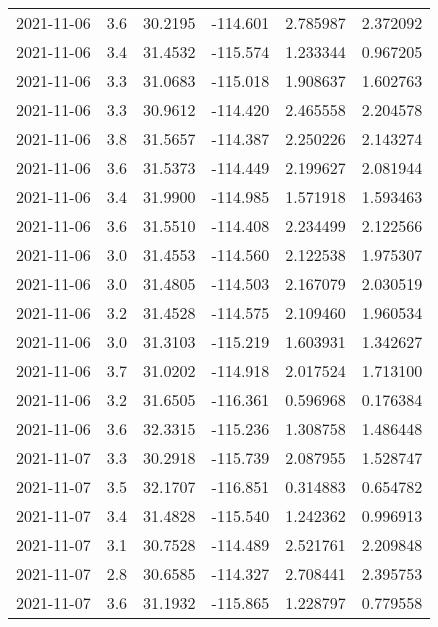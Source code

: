 \begin{tabular}{lrrrrr}
2021-11-06 &       3.6 &  30.2195 &  -114.601 &         2.785987 &         2.372092 \\
2021-11-06 &       3.4 &  31.4532 &  -115.574 &         1.233344 &         0.967205 \\
2021-11-06 &       3.3 &  31.0683 &  -115.018 &         1.908637 &         1.602763 \\
2021-11-06 &       3.3 &  30.9612 &  -114.420 &         2.465558 &         2.204578 \\
2021-11-06 &       3.8 &  31.5657 &  -114.387 &         2.250226 &         2.143274 \\
2021-11-06 &       3.6 &  31.5373 &  -114.449 &         2.199627 &         2.081944 \\
2021-11-06 &       3.4 &  31.9900 &  -114.985 &         1.571918 &         1.593463 \\
2021-11-06 &       3.6 &  31.5510 &  -114.408 &         2.234499 &         2.122566 \\
2021-11-06 &       3.0 &  31.4553 &  -114.560 &         2.122538 &         1.975307 \\
2021-11-06 &       3.0 &  31.4805 &  -114.503 &         2.167079 &         2.030519 \\
2021-11-06 &       3.2 &  31.4528 &  -114.575 &         2.109460 &         1.960534 \\
2021-11-06 &       3.0 &  31.3103 &  -115.219 &         1.603931 &         1.342627 \\
2021-11-06 &       3.7 &  31.0202 &  -114.918 &         2.017524 &         1.713100 \\
2021-11-06 &       3.2 &  31.6505 &  -116.361 &         0.596968 &         0.176384 \\
2021-11-06 &       3.6 &  32.3315 &  -115.236 &         1.308758 &         1.486448 \\
2021-11-07 &       3.3 &  30.2918 &  -115.739 &         2.087955 &         1.528747 \\
2021-11-07 &       3.5 &  32.1707 &  -116.851 &         0.314883 &         0.654782 \\
2021-11-07 &       3.4 &  31.4828 &  -115.540 &         1.242362 &         0.996913 \\
2021-11-07 &       3.1 &  30.7528 &  -114.489 &         2.521761 &         2.209848 \\
2021-11-07 &       2.8 &  30.6585 &  -114.327 &         2.708441 &         2.395753 \\
2021-11-07 &       3.6 &  31.1932 &  -115.865 &         1.228797 &         0.779558 \\

\end{tabular}
